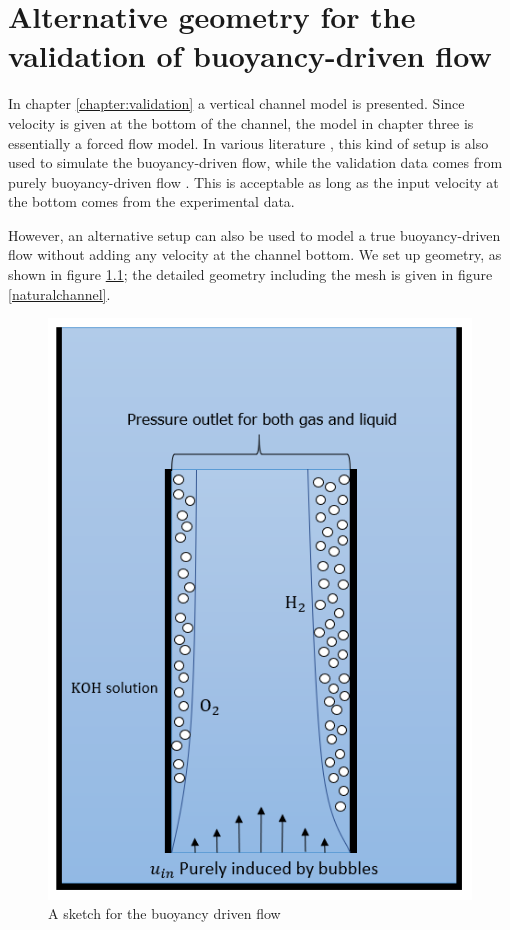 \chapter{Alternative geometry for the validation of buoyancy-driven flow}\label{appendixb}

In chapter \ref{chapter:validation} a vertical channel model is presented. Since velocity is given at the bottom of the channel, the model in chapter three is essentially a forced flow model. In various literature \cite{Wedin2001, Schillings2015}, this kind of setup is also used to simulate the buoyancy-driven flow, while the validation data comes from purely buoyancy-driven flow \cite{Boissonneau2000}. This is acceptable as long as the input velocity at the bottom comes from the experimental data.

However, an alternative setup can also be used to model a true buoyancy-driven flow without adding any velocity at the channel bottom. We set up geometry, as shown in figure \ref{naturalflowchannel}; the detailed geometry including the mesh is given in figure \ref{naturalchannel}.

\begin{figure}[H]
    \centering
    \includegraphics[scale=0.6]{naturalflowchannel.png}
    \caption{A sketch for the buoyancy driven flow}
    \label{naturalflowchannel}
\end{figure}

